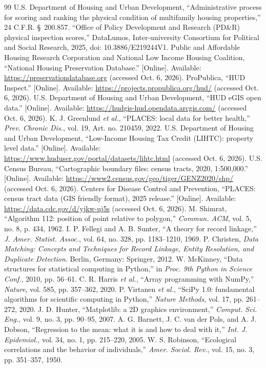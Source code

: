 \documentclass[10pt,twocolumn,letterpaper]{article}
\begin{document}
\begin{thebibliography}{99}
 U.S. Department of Housing and Urban Development, ``Administrative process for scoring and ranking the physical condition of multifamily housing properties,'' 24 C.F.R. \S~200.857.
 ``Office of Policy Development and Research (PD\&R) physical inspection scores,'' DataLumos, Inter-university Consortium for Political and Social Research, 2025, doi: 10.3886/E219244V1.
 Public and Affordable Housing Research Corporation and National Low Income Housing Coalition, ``National Housing Preservation Database.'' [Online]. Available: \url{https://preservationdatabase.org} (accessed Oct. 6, 2026).
 ProPublica, ``HUD Inspect.'' [Online]. Available: \url{https://projects.propublica.org/hud/} (accessed Oct. 6, 2026).
 U.S. Department of Housing and Urban Development, ``HUD eGIS open data.'' [Online]. Available: \url{https://hudgis-hud.opendata.arcgis.com/} (accessed Oct. 6, 2026).
 K. J. Greenlund \emph{et al.}, ``PLACES: local data for better health,'' \emph{Prev. Chronic Dis.}, vol. 19, Art. no. 210459, 2022.
 U.S. Department of Housing and Urban Development, ``Low-Income Housing Tax Credit (LIHTC): property level data.'' [Online]. Available: \url{https://www.huduser.gov/portal/datasets/lihtc.html} (accessed Oct. 6, 2026).
 U.S. Census Bureau, ``Cartographic boundary files: census tracts, 2020, 1:500,000.'' [Online]. Available: \url{https://www2.census.gov/geo/tiger/GENZ2020/shp/} (accessed Oct. 6, 2026).
 Centers for Disease Control and Prevention, ``PLACES: census tract data (GIS friendly format), 2025 release.'' [Online]. Available: \url{https://data.cdc.gov/d/yjkw-uj5s} (accessed Oct. 6, 2026).
 M. Shimrat, ``Algorithm 112: position of point relative to polygon,'' \emph{Commun. ACM}, vol. 5, no. 8, p. 434, 1962.
 I. P. Fellegi and A. B. Sunter, ``A theory for record linkage,'' \emph{J. Amer. Statist. Assoc.}, vol. 64, no. 328, pp. 1183--1210, 1969.
 P. Christen, \emph{Data Matching: Concepts and Techniques for Record Linkage, Entity Resolution, and Duplicate Detection}. Berlin, Germany: Springer, 2012.
 W. McKinney, ``Data structures for statistical computing in Python,'' in \emph{Proc. 9th Python in Science Conf.}, 2010, pp. 56--61.
 C. R. Harris \emph{et al.}, ``Array programming with NumPy,'' \emph{Nature}, vol. 585, pp. 357--362, 2020.
 P. Virtanen \emph{et al.}, ``SciPy 1.0: fundamental algorithms for scientific computing in Python,'' \emph{Nature Methods}, vol. 17, pp. 261--272, 2020.
 J. D. Hunter, ``Matplotlib: a 2D graphics environment,'' \emph{Comput. Sci. Eng.}, vol. 9, no. 3, pp. 90--95, 2007.
 A. G. Barnett, J. C. van der Pols, and A. J. Dobson, ``Regression to the mean: what it is and how to deal with it,'' \emph{Int. J. Epidemiol.}, vol. 34, no. 1, pp. 215--220, 2005.
 W. S. Robinson, ``Ecological correlations and the behavior of individuals,'' \emph{Amer. Sociol. Rev.}, vol. 15, no. 3, pp. 351--357, 1950.
\end{thebibliography}
\end{document}
